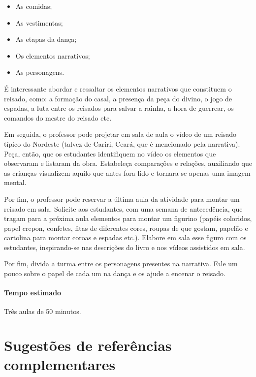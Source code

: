 \documentclass[11pt]{extarticle}
\begin{document}
\begin{itemize}
\item As comidas;

\item As vestimentas;

\item As etapas da dança;

\item Os elementos narrativos;

\item As personagens.
\end{itemize}

É interessante abordar e ressaltar os elementos narrativos que constituem o reisado, como: a formação do casal, a presença da peça do divino, o jogo de espadas, a luta entre os reisados para salvar a rainha, a hora de guerrear, os comandos do mestre do reisado etc.

Em seguida, o professor pode projetar em sala de aula o vídeo de um reisado típico do Nordeste (talvez de Cariri, Ceará, que é mencionado pela narrativa). Peça, então, que os estudantes identifiquem no vídeo os elementos que observaram e listaram da obra. Estabeleça comparações e relações, auxiliando que as crianças visualizem aquilo que antes fora lido e tornara-se apenas uma imagem mental.

Por fim, o professor pode reservar a última aula da atividade para montar um reisado em sala. Solicite aos estudantes, com uma semana de antecedência, que tragam para a próxima aula elementos para montar um figurino (papéis coloridos, papel crepon, confetes, fitas de diferentes cores, roupas de que gostam, papelão e cartolina para montar coroas e espadas etc.). Elabore em sala esse figuro com os estudantes, inspirando-se nas descrições do livro e nos vídeos assistidos em sala.

Por fim, divida a turma entre os personagens presentes na narrativa. Fale um pouco sobre o papel de cada um na dança e os ajude a encenar o reisado.

\paragraph{Tempo estimado} Três aulas de 50 minutos.


\section{Sugestões de referências complementares}
\end{document}
